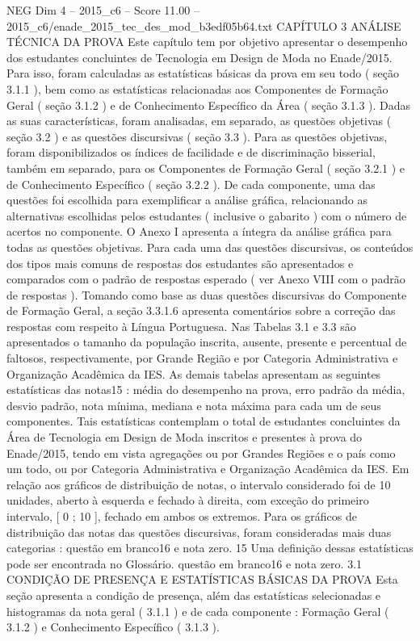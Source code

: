 \begin{textsample}{NEG Dim 4 – 2015\_c6 – Score 11.00 – 2015\_c6/enade\_2015\_tec\_des\_mod\_b3edf05b64.txt}  \label{ex:f4_neg_331}
CAPÍTULO 3 ANÁLISE TÉCNICA DA PROVA Este capítulo tem por objetivo apresentar o desempenho dos estudantes concluintes de Tecnologia em Design de Moda no Enade/2015.
Para isso, foram calculadas as estatísticas básicas da prova em seu todo ( seção 3.1.1 ), bem como as estatísticas relacionadas aos Componentes de Formação Geral ( seção 3.1.2 ) e de Conhecimento Específico da Área ( seção 3.1.3 ).
Dadas as suas características, foram analisadas, em separado, as questões objetivas ( seção 3.2 ) e as questões discursivas ( seção 3.3 ).
Para as questões objetivas, foram disponibilizados os índices de facilidade e de discriminação bisserial, também em separado, para os Componentes de Formação Geral ( seção 3.2.1 ) e de Conhecimento Específico ( seção 3.2.2 ).
De cada componente, uma das questões foi escolhida para exemplificar a análise gráfica, relacionando as alternativas escolhidas pelos estudantes ( inclusive o gabarito ) com o número de acertos no componente.
O Anexo I apresenta a íntegra da análise gráfica para todas as questões objetivas.
Para cada uma das questões discursivas, os conteúdos dos tipos mais comuns de respostas dos estudantes são apresentados e comparados com o padrão de respostas esperado ( ver Anexo VIII com o padrão de respostas ).
Tomando como base as duas questões discursivas do Componente de Formação Geral, a seção 3.3.1.6 apresenta comentários sobre a correção das respostas com respeito à Língua Portuguesa.
Nas Tabelas 3.1 e 3.3 são apresentados o tamanho da população inscrita, ausente, presente e percentual de faltosos, respectivamente, por Grande Região e por Categoria Administrativa e Organização Acadêmica da IES.
As demais tabelas apresentam as seguintes estatísticas das notas15 : média do desempenho na prova, erro padrão da média, desvio padrão, nota mínima, mediana e nota máxima para cada um de seus componentes.
Tais estatísticas contemplam o total de estudantes concluintes da Área de Tecnologia em Design de Moda inscritos e presentes à prova do Enade/2015, tendo em vista agregações ou por Grandes Regiões e o país como um todo, ou por Categoria Administrativa e Organização Acadêmica da IES.
Em relação aos gráficos de distribuição de notas, o intervalo considerado foi de 10 unidades, aberto à esquerda e fechado à direita, com exceção do primeiro intervalo, [ 0 ; 10 ], fechado em ambos os extremos.
Para os gráficos de distribuição das notas das questões discursivas, foram consideradas mais duas categorias : questão em branco16 e nota zero. 15 Uma definição dessas estatísticas pode ser encontrada no Glossário. questão em branco16 e nota zero. 3.1 CONDIÇÃO DE PRESENÇA E ESTATÍSTICAS BÁSICAS DA PROVA Esta seção apresenta a condição de presença, além das estatísticas selecionadas e histogramas da nota geral ( 3.1.1 ) e de cada componente : Formação Geral ( 3.1.2 ) e Conhecimento Específico ( 3.1.3 ).

\end{textsample}
